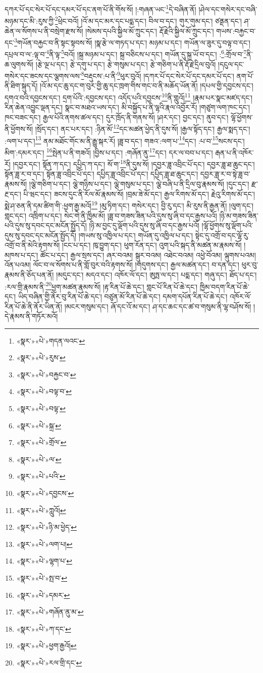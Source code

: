 དཀར་པོ་དང་སེར་པོ་དང་དམར་པོ་དང་ནག་པོ་ནི་གོས་སོ། །:གཞན་ཡང་\footnote{«སྣར་»«པེ་»གདན་ལའང་}དེ་བཞིན་ནོ། །ཤེལ་དང་གསེར་དང་བཞི་མཉམ་དང་མི་:རུས་ཀྱི་\footnote{«སྣར་»«པེ་»རུས་}ཕྲེང་བའོ། །འོ་མ་དང་མར་དང་པདྨ་དང་། བིལ་བ་དང་། གུར་གུམ་དང་། ཙནྡན་དང་། ཤ་ཆེན་ལ་སོགས་པ་ནི་བསྲེག་རྫས་སོ། །སེམས་དཔའི་སྐྱིལ་མོ་ཀྲུང་དང་། རྡོ་རྗེའི་སྐྱིལ་མོ་ཀྲུང་དང་། གཡས་:བརྐྱང་བ་དང་\footnote{«སྣར་»«པེ་»བརྐྱང་བ་}གཡོན་བརྐྱང་བ་ནི་སྟང་སྟབས་སོ། །སྣ་རྩེ་ལ་གཏད་པ་དང་། མཉམ་པ་དང་། གཡོན་ལ་ཟུར་དུ་བལྟ་བ་དང་། དཔྲལ་བ་ལ་:ལྟ་བ་\footnote{«སྣར་»«པེ་»བལྟ་བ་}ནི་ལྟ་\footnote{«སྣར་»«པེ་»བལྟ་}བའོ། །སྐྲ་མཉམ་པ་དང་། སྐྲ་བཅིངས་པ་དང་། གཡོན་དུ་སྐྲ་ཡོ་བ་དང་། :\footnote{«སྣར་»«པེ་»སྐྲ་}:གྲོལ་བ་\footnote{«སྣར་»«པེ་»གྲོལ་}ནི་ཆ་ལུགས་སོ། །རྩེ་ལྔ་པ་དང་། རྩེ་དགུ་པ་དང་། རྩེ་གསུམ་པ་དང་། རྩེ་གཅིག་པ་ནི་རྡོ་རྗེ་དྲིལ་བུའོ། །དངུལ་དང་གསེར་དང་ཟངས་དང་ལྕགས་ལས་\footnote{«སྣར་»«པེ་»ལ་}བརྡུངས་:པ་ནི་\footnote{«སྣར་»«པེ་»པའི་}ཕུར་བུའོ། །དཀར་པོ་དང་སེར་པོ་དང་དམར་པོ་དང་། ནག་པོ་ནི་ཐིག་སྐུད་དོ། །འོ་མ་དང་ཆུ་དང་ག་བུར་གྱི་ཆུ་དང་ཁྲག་གིས་གང་བ་ནི་མཆོད་ཡོན་ནོ། །དཔལ་གྱི་དབྱངས་དང་། དགའ་བའི་དབྱངས་དང་། དྲག་པོའི་:དབྱངས་དང་། འདོད་པའི་དབྱངས་\footnote{«སྣར་»«པེ་»དབྱངས་}ནི་གླུའོ།\footnote{«སྣར་»«པེ་»ཀླུའོ།} །རྣམ་པར་སྣང་མཛད་དང་། རིན་ཆེན་འབྱུང་ལྡན་དང་། སྣང་བ་མཐའ་ཡས་དང་། མི་བསྐྱོད་པ་ནི་ལྷའི་རྣལ་འབྱོར་རོ། །གཙུག་ལག་ཁང་དང་། ཁང་བཟང་དང་། རྒྱལ་པོའི་ནགས་ཚལ་དང་། དུར་ཁྲོད་ནི་གནས་སོ། །ཤར་དང་། བྱང་དང་། ནུབ་དང་། ལྷོ་ཕྱོགས་ནི་ཕྱོགས་སོ། །སྲོད་དང་། ནང་པར་དང་། :ཉིན་མོ་\footnote{«སྣར་»«པེ་»ཉི་མ་ཕྱེད་}དང་མཚན་ཕྱེད་ནི་དུས་སོ། །རྒྱལ་སྟོད་དང་། རྒྱལ་སྨད་དང་། :ལག་པ་དང་།\footnote{«སྣར་»«པེ་»ལག་པ།} ནམ་མཐོང་གོང་མ་ནི་རྒྱུ་སྐར་རོ། །ཟླ་བ་དང་། གཟའ་:ལག་པ་\footnote{«སྣར་»«པེ་»ལྷག་པ་}དང་། :པ་བ་\footnote{«སྣར་»«པེ་»སྤ་བ་}སངས་དང་། མིག་:དམར་དང་། \footnote{«སྣར་»«པེ་»དམར་}སྤེན་པ་ནི་གཟའོ། །བྱིས་པ་དང་། :གཞོན་ནུ་\footnote{«སྣར་»«པེ་»གཞོན་ནུ་མ་}དང་། དར་ལ་བབ་པ་དང་། རྒན་པ་ནི་འཁོར་རོ། །དབྱར་དང་། སྟོན་ཀ་དང་། དཔྱིད་ཀ་དང་། སོ་ག་\footnote{«སྣར་»«པེ་»ཀ་དང་}ནི་དུས་སོ། །དབྱར་ཟླ་འབྲིང་པོ་དང་། དབྱར་ཟླ་ཐ་ཆུང་དང་། སྟོན་ཟླ་ར་བ་དང་། སྟོན་ཟླ་འབྲིང་པོ་དང་། དཔྱིད་ཟླ་འབྲིང་པོ་དང་། དཔྱིད་ཟླ་ཐ་ཆུང་དང་། དབྱར་ཟླ་ར་བ་སྟེ་ཟླ་བ་རྣམས་སོ། །ལྕེ་གཅིག་པ་དང་། ལྕེ་གཉིས་པ་དང་། ལྕེ་གསུམ་པ་དང་། ལྕེ་བཞི་པ་ནི་དྲིལ་བུ་རྣམས་སོ། །དུང་དང་། རྫ་རྔ་དང་། པི་ཝང་དང་། ཟངས་དུང་ནི་རོལ་མོ་རྣམས་སོ། །བྲམ་ཟེ་མོ་དང་། རྒྱལ་རིགས་མོ་དང་། རྗེའུ་རིགས་མོ་དང་། སྨེ་ཤ་ཅན་ནི་དམ་ཚིག་གི་:ཕྱག་རྒྱ་མའོ།\footnote{«སྣར་»«པེ་»ཕྱག་རྒྱའོ།} །མུ་ཏིག་དང་། གསེར་དང་། བྱི་རུ་དང་། མི་རུས་ནི་རྒྱན་ནོ། །ལུག་དང་། གླང་དང་། འཁྲིག་པ་དང་། སེང་གེ་ནི་ཁྱིམ་མོ། །ཟླ་བ་གཟས་ཟིན་པའི་དུས་སུ་ཞི་བ་དང་རྒྱས་པའོ། །ཉི་མ་གཟས་ཟིན་པའི་དུས་སུ་དབང་དང་མངོན་སྤྱོད་དོ། །ཉི་མ་བྱང་དུ་ལྡོག་པའི་དུས་སུ་ཞི་བ་དང་རྒྱས་པའོ། །ལྷོ་ཕྱོགས་སུ་ལྡོག་པའི་དུས་སུ་དབང་དང་མངོན་སྤྱོད་དོ། །གཡས་སུ་འཁྱིལ་པ་དང་། གཡོན་དུ་འཁྱིལ་པ་དང་། སྟེང་དུ་འགྲོ་བ་དང་ལྷོ་རུ་འགྲོ་བ་ནི་མེའི་རྟགས་སོ། །ངང་པ་དང་། ཁུ་བྱུག་དང་། ཕུག་རོན་དང་། འུག་པའི་སྐད་ནི་མཚན་མ་རྣམས་སོ། །མཁས་པ་དང་། ཚོང་པ་དང་། རྒྱལ་སྲས་དང་། ཞར་བའམ། སྒུར་བའམ། འཐེང་བའམ། འཕྱེ་བོའམ། ལྐུགས་པའམ། འོན་པའམ། ལོང་བ་ལ་སོགས་པ་ནི་གློ་བུར་བའི་རྟགས་སོ། །གདུགས་དང་། རྒྱལ་མཚན་དང་། བ་དན་དང་། ཕུར་བུ་རྣམས་ནི་ཅོད་པན་ནོ། །མདུང་དང་། མདའ་དང་། འཁོར་ལོ་དང་། ཨུཏྤ་ལ་དང་། པདྨ་དང་། གཞུ་དང་། ཐོད་པ་དང་། :རལ་གྲི་རྣམས་ནི་\footnote{«སྣར་»«པེ་»རལ་གྲི་དང་}ཕྱག་མཚན་རྣམས་སོ། །རྟ་རིན་པོ་ཆེ་དང་། གླང་པོ་རིན་པོ་ཆེ་དང་། ཁྱིམ་བདག་རིན་པོ་ཆེ་དང་། ཡིད་བཞིན་གྱི་ནོར་བུ་རིན་པོ་ཆེ་དང་། བཙུན་མོ་རིན་པོ་ཆེ་དང་། དམག་དཔོན་རིན་པོ་ཆེ་དང་། འཁོར་ལོ་རིན་པོ་ཆེ་ནི་ནོར་ཡིན་ནོ། །མངར་གསུམ་དང་། ཞོ་དང་འོ་མ་དང་། ཤ་དང་ཆང་དང་ཚ་བ་གསུམ་ནི་ལྷ་བཤོས་སོ། །དེ་རྣམས་ནི་གཏོར་མའོ། 